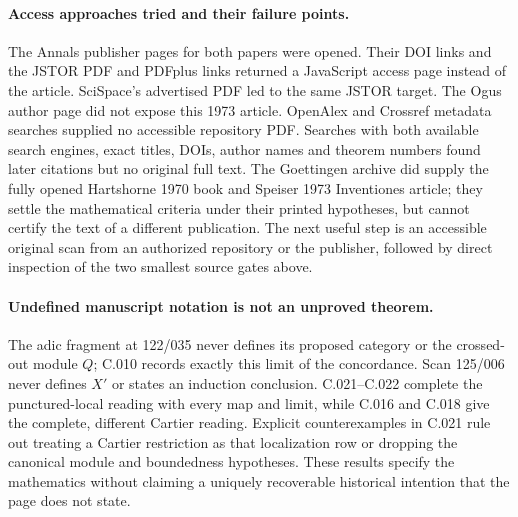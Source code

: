 \paragraph{Access approaches tried and their failure points.}
The Annals publisher pages for both papers were opened. Their
DOI links and the JSTOR PDF and PDFplus links returned a
JavaScript access page instead of the article. SciSpace's
advertised PDF led to the same JSTOR target. The Ogus author
page did not expose this 1973 article. OpenAlex and Crossref
metadata searches supplied no accessible repository PDF.
Searches with both available search engines, exact titles,
DOIs, author names and theorem numbers found later citations
but no original full text. The Goettingen archive did supply
the fully opened Hartshorne 1970 book and Speiser 1973
Inventiones article; they settle the mathematical criteria
under their printed hypotheses, but cannot certify the text
of a different publication. The next useful step is an
accessible original scan from an authorized repository or
the publisher, followed by direct inspection of the two
smallest source gates above.

\paragraph{Undefined manuscript notation is not an unproved theorem.}
The adic fragment at 122/035 never defines its proposed category
or the crossed-out module $Q$; C.010 records exactly this limit
of the concordance. Scan 125/006 never defines $X'$ or states
an induction conclusion. C.021--C.022 complete the
punctured-local reading with every map and limit, while
C.016 and C.018 give the complete, different Cartier reading.
Explicit counterexamples in C.021 rule out treating a Cartier
restriction as that localization row or dropping the canonical
module and boundedness hypotheses. These results specify the
mathematics without claiming a uniquely recoverable historical
intention that the page does not state.
